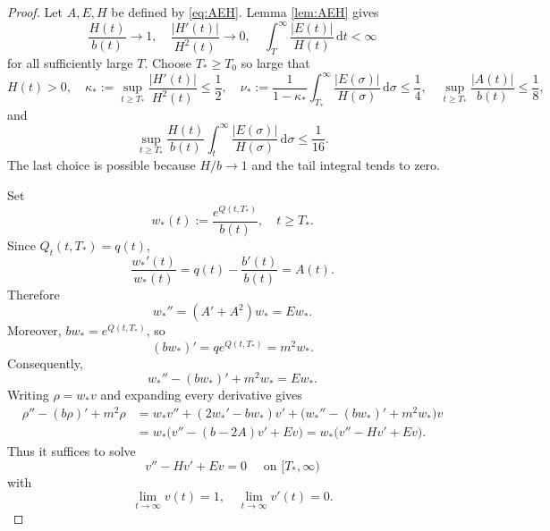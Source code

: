 \documentclass[11pt,reqno]{amsart}
\theoremstyle{definition}
\theoremstyle{remark}
\begin{document}
	\begin{proof}
		Let $A,E,H$ be defined by \eqref{eq:AEH}. Lemma \ref{lem:AEH} gives
		$$
		\frac{H(t)}{b(t)}\longrightarrow1,
		\quad
		\frac{|H'(t)|}{H^2(t)}\longrightarrow0,
		\quad
		\int_T^\infty\frac{|E(t)|}{H(t)}\,\mathrm{d}t<\infty
		$$
		for all sufficiently large $T$. Choose $T_*\geq T_0$ so large that
		$$
		H(t)>0,
		\quad
		\kappa_*:=\sup_{t\geq T_*}\frac{|H'(t)|}{H^2(t)}\leq\frac12, \quad
		\nu_*:=\frac{1}{1-\kappa_*}
		\int_{T_*}^\infty\frac{|E(\sigma)|}{H(\sigma)}\,\mathrm{d}\sigma
		\leq\frac14,
		\quad
		\sup_{t\geq T_*}\frac{|A(t)|}{b(t)}\leq\frac18,
		$$
		and
		$$
		\sup_{t\geq T_*}
		\frac{H(t)}{b(t)}
		\int_t^\infty\frac{|E(\sigma)|}{H(\sigma)}\,\mathrm{d}\sigma
		\leq\frac{1}{16}.
		$$
		The last choice is possible because $H/b\to1$ and the tail integral tends to zero.
		
		Set
		$$
		w_*(t):=\frac{e^{Q(t,T_*)}}{b(t)},
		\quad t\geq T_*.
		$$
		Since $Q_t(t,T_*)=q(t)$,
		$$
		\frac{w_*'(t)}{w_*(t)}
		=q(t)-\frac{b'(t)}{b(t)}=A(t).
		$$
		Therefore
		$$
		w_*''=(A'+A^2)w_*=Ew_*.
		$$
		Moreover, $bw_*=e^{Q(t,T_*)}$, so
		$$
		(bw_*)'=q e^{Q(t,T_*)}=m^2w_*.
		$$
		Consequently,
		$$
		w_*''-(bw_*)'+m^2w_*=Ew_*.
		$$
		Writing $\rho=w_*v$ and expanding every derivative gives
		\begin{align*}
			\rho''-(b\rho)'+m^2\rho&=w_*v''+(2w_*'-bw_*)v'
			+\bigl(w_*''-(bw_*)'+m^2w_*\bigr)v\\
			&=w_*\bigl(v''-(b-2A)v'+Ev\bigr)
			=w_*\bigl(v''-Hv'+Ev\bigr).
		\end{align*}
		Thus it suffices to solve
		\begin{equation}
			\label{eq:vode}
			v''-Hv'+Ev=0
			\quad \text{ on } [T_*,\infty)
		\end{equation}
		with
		$$
		\lim_{t\to\infty}v(t)=1,
		\quad
		\lim_{t\to\infty}v'(t)=0.
		$$
		

\end{proof}
\end{document}
